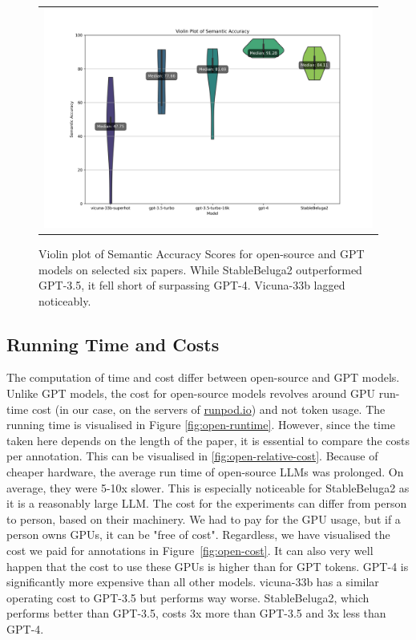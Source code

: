 \begin{figure}[ht]
  \centering
  \begin{tabular}{c}
  \includegraphics[width=14cm]{images/open-semantic.png}
  \end{tabular}
  \caption[Semantic Accuracy]{Violin plot of Semantic Accuracy Scores for open-source and GPT models on selected six papers. While StableBeluga2 outperformed GPT-3.5, it fell short of surpassing GPT-4. Vicuna-33b lagged noticeably.}\label{fig:open-semantic}
\end{figure}

\subsection{Running Time and Costs}

The computation of time and cost differ between open-source and GPT models. Unlike GPT models, the cost for open-source models revolves around GPU run-time cost (in our case, on the servers of \href{https://runpod.io}{runpod.io}) and not token usage. The running time is visualised in Figure \ref{fig:open-runtime}. However, since the time taken here depends on the length of the paper, it is essential to compare the costs per annotation. This can be visualised in \ref{fig:open-relative-cost}. Because of cheaper hardware, the average run time of open-source LLMs was prolonged. On average, they were 5-10x slower. This is especially noticeable for StableBeluga2 as it is a reasonably large LLM. The cost for the experiments can differ from person to person, based on their machinery. We had to pay for the GPU usage, but if a person owns GPUs, it can be "free of cost". Regardless, we have visualised the cost we paid for annotations in Figure~\ref{fig:open-cost}. It can also very well happen that the cost to use these GPUs is higher than for GPT tokens. GPT-4 is significantly more expensive than all other models. vicuna-33b has a similar operating cost to GPT-3.5 but performs way worse. StableBeluga2, which performs better than GPT-3.5, costs 3x more than GPT-3.5 and 3x less than GPT-4.

